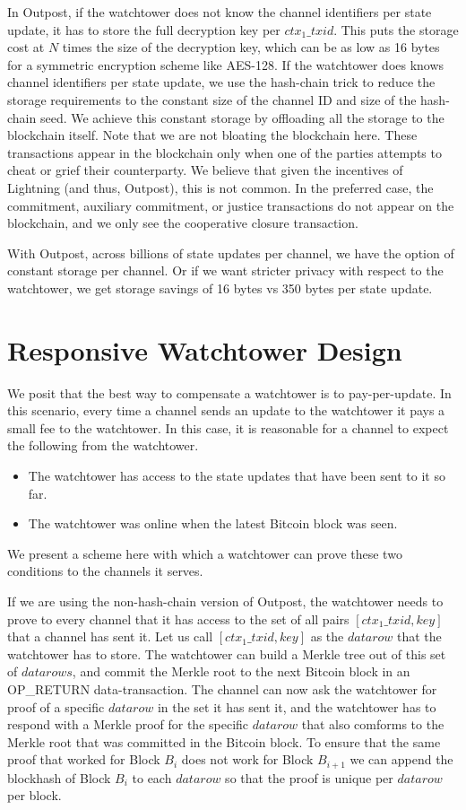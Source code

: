 In Outpost, if the watchtower does not know the channel identifiers per state update, it has to store the full decryption key per $\mathit{ctx_1\_txid}$. This puts the storage cost at $N$ times the size of the decryption key, which can be as low as 16 bytes for a symmetric encryption scheme like AES-128. If the watchtower does knows channel identifiers per state update, we use the hash-chain trick to reduce the storage requirements to the constant size of the channel ID and size of the hash-chain seed. We achieve this constant storage by offloading all the storage to the blockchain itself. Note that we are not bloating the blockchain here. These transactions appear in the blockchain only when one of the parties attempts to cheat or grief their counterparty. We believe that given the incentives of Lightning (and thus, Outpost), this is not common. In the preferred case, the commitment, auxiliary commitment, or justice transactions do not appear on the blockchain, and we only see the cooperative closure transaction.

With Outpost, across billions of state updates per channel, we have the option of constant storage per channel. Or if we want stricter privacy with respect to the watchtower, we get storage savings of 16 bytes vs 350 bytes per state update.

\section{Responsive Watchtower Design}
We posit that the best way to compensate a watchtower is to pay-per-update. In this scenario, every time a channel sends an update to the watchtower it pays a small fee to the watchtower. In this case, it is reasonable for a channel to expect the following from the watchtower.
\begin{itemize}
    \item The watchtower has access to the state updates that have been sent to it so far.
    \item The watchtower was online when the latest Bitcoin block was seen.
\end{itemize}
We present a scheme here with which a watchtower can prove these two conditions to the channels it serves.

If we are using the non-hash-chain version of Outpost, the watchtower needs to prove to every channel that it has access to the set of all pairs $\mathit{[ctx_1\_txid, key]}$ that a channel has sent it. Let us call $\mathit{[ctx_1\_txid, key]}$ as the $\mathit{datarow}$ that the watchtower has to store. The watchtower can build a Merkle tree out of this set of $\mathit{datarows}$, and commit the Merkle root to the next Bitcoin block in an OP\_RETURN data-transaction. The channel can now ask the watchtower for proof of a specific $\mathit{datarow}$ in the set it has sent it, and the watchtower has to respond with a Merkle proof for the specific $\mathit{datarow}$ that also comforms to the Merkle root that was committed in the Bitcoin block. To ensure that the same proof that worked for Block $B_i$ does not work for Block $B_{i+1}$ we can append the blockhash of Block $B_i$ to each $\mathit{datarow}$ so that the proof is unique per $\mathit{datarow}$ per block.

